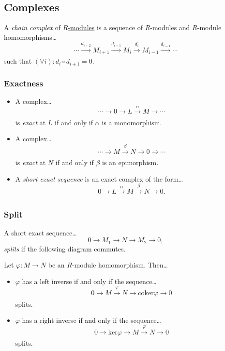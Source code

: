 \subsection{Complexes}\label{complexes}
A \emph{chain complex} of \hyperref[modules]{$R$-modules} is a sequence of $R$-modules and $R$-module homomorphisms\dots
$$\cdots \xrightarrow[]{d_{i+2}}  M_{i+1}  \xrightarrow[]{d_{i+1}} M_{i}\xrightarrow[]{d_{i}} M_{i-1} \xrightarrow[]{d_{i-1}} \cdots$$
such that $(\forall i) : d_i \circ d_{i+1} = 0.$

\subsubsection{Exactness}\label{exact}
\begin{itemize}
  \item A complex\dots
$$\cdots \rightarrow 0 \rightarrow L \xrightarrow[]{\alpha} M \rightarrow \cdots$$
is \emph{exact} at $L$ if and only if $\alpha$ is a monomorphism.
  \item A complex\dots
$$\cdots \rightarrow M \xrightarrow[]{\beta} N \rightarrow 0 \rightarrow \cdots$$
is \emph{exact} at $N$ if and only if $\beta$ is an epimorphism.
  \item A \emph{short exact sequence}\label{shortexactsequence} is an exact complex of the form\dots
$$0 \rightarrow L \xrightarrow[]{\alpha} M \xrightarrow[]{\beta} N \rightarrow 0.$$
\end{itemize}
 
\subsubsection{Split}\label{split}
A short exact sequence\dots
$$0 \rightarrow M_1 \rightarrow N \rightarrow M_2 \rightarrow 0,$$
\emph{splits} if the following diagram commutes.
\begin{figure}[H]
\centering

\end{figure}

\begin{proposition}
Let $\varphi : M \rightarrow N$ be an $R$-module homomorphism. Then\dots
\begin{itemize}
  \item $\varphi$ has a left inverse if and only if the sequence\dots
  $$0 \rightarrow M \xrightarrow[]{\varphi} N \rightarrow \textrm{coker}\varphi \rightarrow 0$$
  splits.
  \item $\varphi$ has a right inverse if and only if the sequence\dots
  $$0 \rightarrow \textrm{ker}\varphi \rightarrow M \xrightarrow[]{\varphi} N \rightarrow 0$$
  splits.
\end{itemize}
\end{proposition}